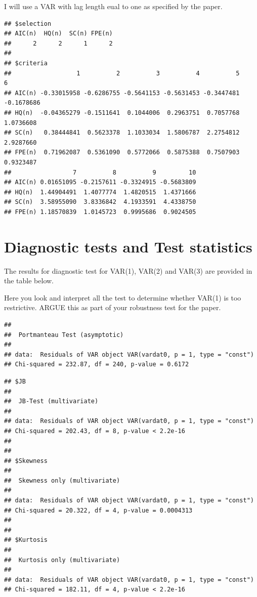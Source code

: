 \documentclass[11pt,preprint, authoryear]{elsarticle}
\numberwithin{equation}{section}
\numberwithin{figure}{section}
\numberwithin{table}{section}
\begin{document}
I will use a VAR with lag length eual to one as specified by the paper.

\begin{verbatim}
## $selection
## AIC(n)  HQ(n)  SC(n) FPE(n) 
##      2      2      1      2 
## 
## $criteria
##                  1          2          3          4          5          6
## AIC(n) -0.33015958 -0.6286755 -0.5641153 -0.5631453 -0.3447481 -0.1678686
## HQ(n)  -0.04365279 -0.1511641  0.1044006  0.2963751  0.7057768  1.0736608
## SC(n)   0.38444841  0.5623378  1.1033034  1.5806787  2.2754812  2.9287660
## FPE(n)  0.71962087  0.5361090  0.5772066  0.5875388  0.7507903  0.9323487
##                 7          8          9         10
## AIC(n) 0.01651095 -0.2157611 -0.3324915 -0.5683809
## HQ(n)  1.44904491  1.4077774  1.4820515  1.4371666
## SC(n)  3.58955090  3.8336842  4.1933591  4.4338750
## FPE(n) 1.18570839  1.0145723  0.9995686  0.9024505
\end{verbatim}

\hypertarget{diagnostic-tests-and-test-statistics}{%
\section{Diagnostic tests and Test
statistics}\label{diagnostic-tests-and-test-statistics}}

The results for diagnostic test for VAR(1), VAR(2) and VAR(3) are
provided in the table below.

Here you look and interpret all the test to determine whether VAR(1) is
too restrictive. ARGUE this as part of your robustness test for the
paper.

\begin{verbatim}
## 
##  Portmanteau Test (asymptotic)
## 
## data:  Residuals of VAR object VAR(vardat0, p = 1, type = "const")
## Chi-squared = 232.87, df = 240, p-value = 0.6172
\end{verbatim}

\begin{verbatim}
## $JB
## 
##  JB-Test (multivariate)
## 
## data:  Residuals of VAR object VAR(vardat0, p = 1, type = "const")
## Chi-squared = 202.43, df = 8, p-value < 2.2e-16
## 
## 
## $Skewness
## 
##  Skewness only (multivariate)
## 
## data:  Residuals of VAR object VAR(vardat0, p = 1, type = "const")
## Chi-squared = 20.322, df = 4, p-value = 0.0004313
## 
## 
## $Kurtosis
## 
##  Kurtosis only (multivariate)
## 
## data:  Residuals of VAR object VAR(vardat0, p = 1, type = "const")
## Chi-squared = 182.11, df = 4, p-value < 2.2e-16
\end{verbatim}
\end{document}
